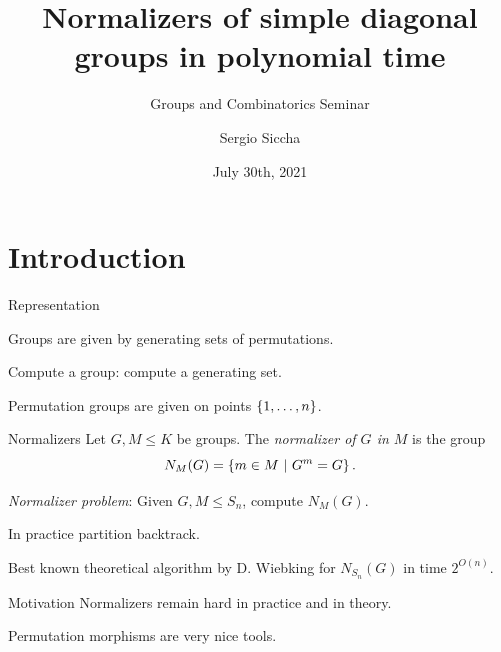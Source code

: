 \documentclass{beamer}
\title{Normalizers of simple diagonal groups in polynomial time}
\subtitle{Groups and Combinatorics Seminar}
\date{July 30th, 2021}
\author{Sergio Siccha}
\institute{TU Kaiserslautern}
\theoremstyle{plain}
\theoremstyle{definition}
\begin{document}
\maketitle
{}

\section{Introduction}

\begin{frame}{Representation}

Groups are given by generating sets of permutations.

Compute a group: compute a generating set.

Permutation groups are given on points $ \left\{ 1, \ldots, n \right\} $.

\end{frame}

\begin{frame}{Normalizers}
Let $G, M \leq K$ be groups.
The \emph{normalizer of $G$ in $M$} is
the group
\[
N_M(G) =  \left\{  m \in M ~|~ G ^ m = G  \right\} .
\]

\pause
\emph{Normalizer problem}: Given $G, M \leq S_n$, compute $N_M(G)$.

\pause
In practice partition backtrack.

Best known theoretical algorithm by D. Wiebking for
$N_{S_n}(G)$ in
time $2 ^ {O(n)}$.
\end{frame}



\begin{frame}{Motivation}
Normalizers remain hard in practice and in theory.

Permutation morphisms are very nice tools.
\end{frame}

\end{document}
